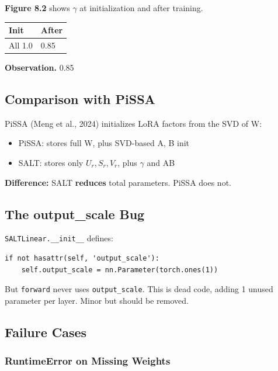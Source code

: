 \textbf{Figure 8.2} shows $\gamma$ at initialization and after training.

\begin{table}[H]
\centering
\small
\begin{tabular}{ll}
\toprule
\textbf{Init} & \textbf{After} \\
\midrule
All 1.0 & 0.85 \\
\bottomrule
\end{tabular}
\end{table}

\textbf{Observation.} 0.85

\subsection{Comparison with PiSSA}

PiSSA (Meng et al., 2024) initializes LoRA factors from the SVD of W:

\begin{itemize}
\item PiSSA: stores full W, plus SVD-based A, B init
\item SALT: stores only $U_r, S_r, V_r$, plus $\gamma$ and AB

\end{itemize}
\textbf{Difference:} SALT \textbf{reduces} total parameters. PiSSA does not.

\subsection{The output\_scale Bug}

\texttt{SALTLinear.\_\_init\_\_} defines:

\begin{lstlisting}
if not hasattr(self, 'output_scale'):
    self.output_scale = nn.Parameter(torch.ones(1))
\end{lstlisting}

But \texttt{forward} never uses \texttt{output\_scale}. This is dead code, adding 1 unused 
parameter per layer. Minor but should be removed.

\subsection{Failure Cases}

\subsubsection{RuntimeError on Missing Weights}

